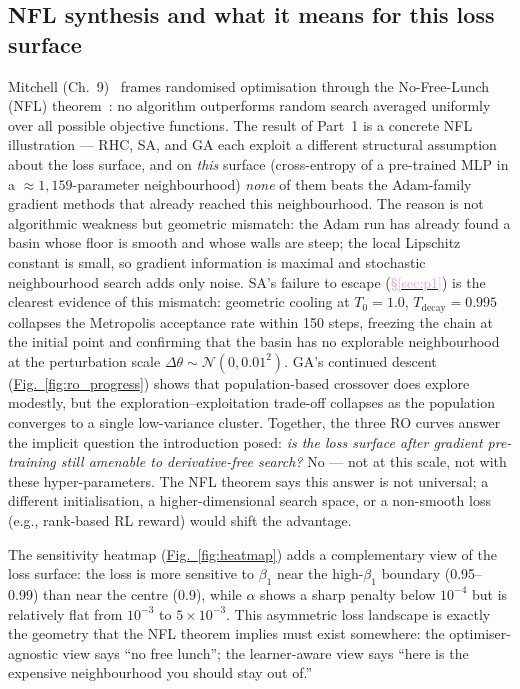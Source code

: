 \documentclass[conference]{IEEEtran}
\newcommand{\figref}[1]{\hyperref[#1]{\textcolor{denim_comp}{Fig.~\ref*{#1}}}}
\newcommand{\secref}[1]{\hyperref[#1]{\textcolor{plum}{\S\ref*{#1}}}}
\begin{document}
\subsection{NFL synthesis and what it means for this loss surface}\label{sec:disc:nfl}
Mitchell (Ch.~9)~\cite{mitchell1997} frames randomised optimisation through the
No-Free-Lunch (NFL) theorem~\cite{wolpert1996nfl}: no algorithm outperforms
random search averaged uniformly over all possible objective functions.
The result of Part~1 is a concrete NFL illustration --- RHC, SA, and GA
each exploit a different structural assumption about the loss surface,
and on \emph{this} surface (cross-entropy of a pre-trained MLP in a
${\approx}1{,}159$-parameter neighbourhood) \emph{none} of them beats the
Adam-family gradient methods that already reached this neighbourhood.
The reason is not algorithmic weakness but geometric mismatch: the Adam
run has already found a basin whose floor is smooth and whose walls are
steep; the local Lipschitz constant is small, so gradient information is
maximal and stochastic neighbourhood search adds only noise.
SA's failure to escape (\secref{sec:p1}) is the clearest evidence of this
mismatch: geometric cooling at $T_0{=}1.0$, $T_{\text{decay}}{=}0.995$
collapses the Metropolis acceptance rate within 150 steps, freezing the
chain at the initial point and confirming that the basin has no explorable
neighbourhood at the perturbation scale $\Delta\theta{\sim}\mathcal{N}(0,0.01^2)$.
GA's continued descent (\figref{fig:ro_progress}) shows that population-based
crossover does explore modestly, but the exploration--exploitation trade-off
collapses as the population converges to a single low-variance cluster.
Together, the three RO curves answer the implicit question the introduction
posed: \emph{is the loss surface after gradient pre-training still amenable
to derivative-free search?}
No --- not at this scale, not with these hyper-parameters.
The NFL theorem says this answer is not universal; a different initialisation,
a higher-dimensional search space, or a non-smooth loss (e.g., rank-based RL
reward) would shift the advantage.

The sensitivity heatmap (\figref{fig:heatmap}) adds a complementary view
of the loss surface: the loss is more sensitive to $\beta_1$ near the
high-$\beta_1$ boundary (0.95--0.99) than near the centre (0.9), while
$\alpha$ shows a sharp penalty below $10^{-4}$ but is relatively flat from
$10^{-3}$ to $5{\times}10^{-3}$.
This asymmetric loss landscape is exactly the geometry that the NFL theorem
implies must exist somewhere: the optimiser-agnostic view says ``no free
lunch''; the learner-aware view says ``here is the expensive neighbourhood
you should stay out of.''
\end{document}

